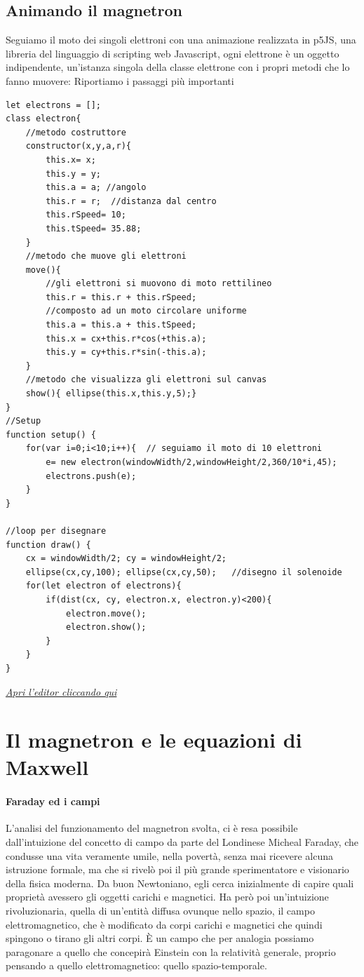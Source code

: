 \documentclass{article}
\begin{document}
{\subsection{Animando il magnetron}
Seguiamo il moto dei singoli elettroni con una animazione realizzata in p5JS, una libreria del linguaggio di scripting web Javascript, ogni elettrone è un oggetto indipendente, un'istanza singola della classe elettrone con i propri metodi che lo fanno muovere: 
Riportiamo i passaggi più importanti
  {\scriptsize \begin{verbatim}
let electrons = [];
class electron{
	//metodo costruttore
	constructor(x,y,a,r){
		this.x= x;        
		this.y = y;     
		this.a = a; //angolo
		this.r = r;  //distanza dal centro
		this.rSpeed= 10;
		this.tSpeed= 35.88;
	}
	//metodo che muove gli elettroni
	move(){
		//gli elettroni si muovono di moto rettilineo
		this.r = this.r + this.rSpeed;
		//composto ad un moto circolare uniforme
        this.a = this.a + this.tSpeed;
		this.x = cx+this.r*cos(+this.a); 
		this.y = cy+this.r*sin(-this.a);
	}
	//metodo che visualizza gli elettroni sul canvas
	show(){ ellipse(this.x,this.y,5);} 
}
//Setup
function setup() {
	for(var i=0;i<10;i++){  // seguiamo il moto di 10 elettroni
		e= new electron(windowWidth/2,windowHeight/2,360/10*i,45);
		electrons.push(e);
	}
}

//loop per disegnare
function draw() {
	cx = windowWidth/2; cy = windowHeight/2;
	ellipse(cx,cy,100); ellipse(cx,cy,50);   //disegno il solenoide
	for(let electron of electrons){
		if(dist(cx, cy, electron.x, electron.y)<200){
			electron.move();
			electron.show();
		}
	}
}
\end{verbatim} } 
\href{https://editor.p5js.org/freihm15@gmail.com/sketches/Ibo6ae2T1}{\textit{Apri l'editor cliccando qui}}
  
\section{Il magnetron e le equazioni di Maxwell}
}
\paragraph {Faraday ed i campi} L'analisi del funzionamento del magnetron svolta, ci è resa possibile dall'intuizione del concetto di campo da parte del Londinese Micheal Faraday, che condusse una vita veramente umile, nella povertà, senza mai ricevere alcuna istruzione formale, ma che si rivelò poi il più grande sperimentatore e visionario della fisica moderna. Da buon Newtoniano, egli cerca inizialmente di capire quali proprietà avessero gli oggetti carichi e magnetici. Ha però poi un'intuizione rivoluzionaria, quella di un'entità diffusa ovunque nello spazio, il campo elettromagnetico, che è modificato da corpi carichi e magnetici che quindi spingono o tirano gli altri corpi. È un campo che per analogia possiamo paragonare a quello che concepirà Einstein con la relatività generale, proprio pensando a quello elettromagnetico: quello spazio-temporale.
\end{document}

